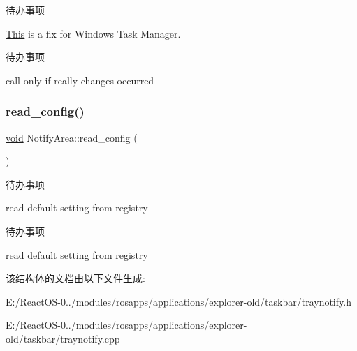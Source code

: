 \begin{DoxyRefDesc}{待办事项}
\item[\hyperlink{todo__todo000075}{待办事项}]\hyperlink{namespace_this}{This} is a fix for Windows Task Manager. \end{DoxyRefDesc}


\begin{DoxyRefDesc}{待办事项}
\item[\hyperlink{todo__todo000076}{待办事项}]call only if really changes occurred \end{DoxyRefDesc}
\mbox{\label{struct_notify_area_a8971bf38f7f751fb5e428692ae98d7bd}} 
\subsubsection{\texorpdfstring{read\+\_\+config()}{read\_config()}}
{\footnotesize\ttfamily \hyperlink{interfacevoid}{void} Notify\+Area\+::read\+\_\+config (\begin{DoxyParamCaption}{ }\end{DoxyParamCaption})\hspace{0.3cm}{\ttfamily [protected]}}

\begin{DoxyRefDesc}{待办事项}
\item[\hyperlink{todo__todo000073}{待办事项}]read default setting from registry \end{DoxyRefDesc}


\begin{DoxyRefDesc}{待办事项}
\item[\hyperlink{todo__todo000074}{待办事项}]read default setting from registry \end{DoxyRefDesc}


该结构体的文档由以下文件生成\+:\begin{DoxyCompactItemize}
\item 
E\+:/\+React\+O\+S-\/0../modules/rosapps/applications/explorer-\/old/taskbar/traynotify.\+h\item 
E\+:/\+React\+O\+S-\/0../modules/rosapps/applications/explorer-\/old/taskbar/traynotify.\+cpp\end{DoxyCompactItemize}
